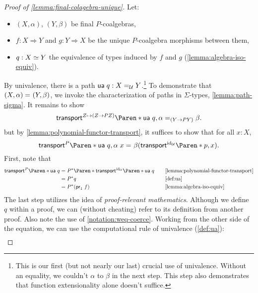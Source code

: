 \documentclass[12pt,twoside,draft]{reedthesis}
\begin{document}
\begin{proof}[Proof of \cref{lemma:final-colagebra-unique}]
  Let:
  \begin{itemize}
    \itemsep0em
    \item $(X,\alpha)$, $(Y,\beta)$ be final $P$-coalgebras,
    \item $f:X\Rightarrow Y$ and $g:Y\Rightarrow X$ be the unique $P$-coalgebra
      morphisms between them,
    \item $q:X \simeq Y$ the equivalence of types induced by $f$ and $g$
      (\cref{lemma:algebra-iso-equiv}).
  \end{itemize}
  By univalence, there is a path
    $\mathsf{ua}\hspace{0.3em} q:X =_{\mathcal{U}} Y$.\footnote{This
    is our first (but not nearly our last) crucial use of univalence. Without an
    equality, we couldn't \transportname{} $\alpha$ to $\beta$ in the next step.
    This step also demonstrates that function extensionality alone doesn't
    suffice.} 
  To demonstrate that $(X,\alpha) =_{} (Y,\beta)$, we invoke the
  characterization of paths in $\Sigma$-types, \cref{lemma:path-sigma}. It
  remains to show
  \begin{equation*}
    \propeq{(Y\to PY)}{\transport{Z\mapsto (Z\to PZ)}{\apply{\ua}{q}}{\alpha}}{\beta}.
  \end{equation*}
  but by \cref{lemma:polynomial-functor-transport}, it suffices to show that
  for all $x:X$,
  \begin{equation*}
    \propeq{}{
      \transport{P}{\apply{\ua}{q}}{\apply{\alpha}{x}}
    }{
      \beta(\transport{\id_\universe}{p}{x})
    }.
  \end{equation*}
  First, note that
  \begin{align*}
    \transpor{P}{\apply{\ua}{q}}
    &= P^*\paren{\transpor{\id_{\universe}}{\apply{\ua}{q}}}
    &&\quad\text{\Cref{lemma:polynomial-functor-transport}} \\
    &= P^*q
    &&\quad\text{\Cref{def:ua}} \\
    &= P^*(\appr{1}{f})
    &&\quad\text{\Cref{lemma:algebra-iso-equiv}}
  \end{align*}
  The last step utilizes the idea of \textit{proof-relevant
    mathematics}. Although we define $q$ within a proof, we can (without
  cheating) refer to its definition from another proof. Also note the
  use of \cref{notation:weq-coerce}. Working from the other side of the
  equation, we can use the computational rule of univalence (\cref{def:ua}):
  \begin{align*}

\end{align*}
\end{proof}
\end{document}
